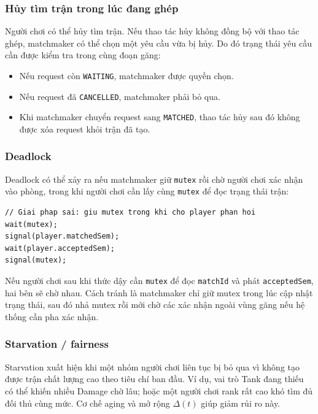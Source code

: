 \subsubsection*{Hủy tìm trận trong lúc đang ghép}

Người chơi có thể hủy tìm trận. Nếu thao tác hủy không đồng bộ với thao tác
ghép, matchmaker có thể chọn một yêu cầu vừa bị hủy. Do đó trạng thái yêu cầu
cần được kiểm tra trong cùng đoạn găng:

\begin{itemize}
    \item Nếu request còn \texttt{WAITING}, matchmaker được quyền chọn.
    \item Nếu request đã \texttt{CANCELLED}, matchmaker phải bỏ qua.
    \item Khi matchmaker chuyển request sang \texttt{MATCHED}, thao tác hủy sau
    đó không được xóa request khỏi trận đã tạo.
\end{itemize}

\subsubsection*{Deadlock}

Deadlock có thể xảy ra nếu matchmaker giữ \texttt{mutex} rồi chờ người chơi xác
nhận vào phòng, trong khi người chơi cần lấy cùng \texttt{mutex} để đọc trạng
thái trận:

\begin{lstlisting}
// Giai phap sai: giu mutex trong khi cho player phan hoi
wait(mutex);
signal(player.matchedSem);
wait(player.acceptedSem);
signal(mutex);
\end{lstlisting}

Nếu người chơi sau khi thức dậy cần \texttt{mutex} để đọc \texttt{matchId} và
phát \texttt{acceptedSem}, hai bên sẽ chờ nhau. Cách tránh là matchmaker chỉ
giữ mutex trong lúc cập nhật trạng thái, sau đó nhả mutex rồi mới chờ các xác
nhận ngoài vùng găng nếu hệ thống cần pha xác nhận.

\subsubsection*{Starvation / fairness}

Starvation xuất hiện khi một nhóm người chơi liên tục bị bỏ qua vì không tạo
được trận chất lượng cao theo tiêu chí ban đầu. Ví dụ, vai trò Tank đang thiếu
có thể khiến nhiều Damage chờ lâu; hoặc một người chơi rank rất cao khó tìm đủ
đối thủ cùng mức. Cơ chế aging và mở rộng \(\Delta(t)\) giúp giảm rủi ro này.


